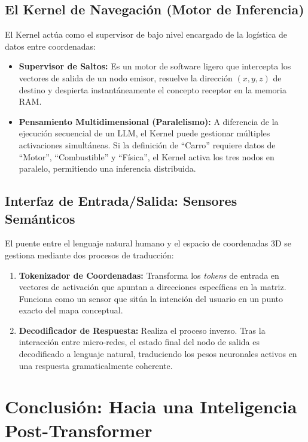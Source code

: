 \documentclass[12pt]{article}
\begin{document}
\subsection{El Kernel de Navegación (Motor de Inferencia)}
El Kernel actúa como el supervisor de bajo nivel encargado de la logística de datos entre coordenadas:
\begin{itemize}
    \item \textbf{Supervisor de Saltos:} Es un motor de software ligero que intercepta los vectores de salida de un nodo emisor, resuelve la dirección $(x,y,z)$ de destino y despierta instantáneamente el concepto receptor en la memoria RAM.
    \item \textbf{Pensamiento Multidimensional (Paralelismo):} A diferencia de la ejecución secuencial de un LLM, el Kernel puede gestionar múltiples activaciones simultáneas. Si la definición de ``Carro'' requiere datos de ``Motor'', ``Combustible'' y ``Física'', el Kernel activa los tres nodos en paralelo, permitiendo una inferencia distribuida.
\end{itemize}



\subsection{Interfaz de Entrada/Salida: Sensores Semánticos}
El puente entre el lenguaje natural humano y el espacio de coordenadas 3D se gestiona mediante dos procesos de traducción:
\begin{enumerate}
    \item \textbf{Tokenizador de Coordenadas:} Transforma los \textit{tokens} de entrada en vectores de activación que apuntan a direcciones específicas en la matriz. Funciona como un sensor que sitúa la intención del usuario en un punto exacto del mapa conceptual.
    \item \textbf{Decodificador de Respuesta:} Realiza el proceso inverso. Tras la interacción entre micro-redes, el estado final del nodo de salida es decodificado a lenguaje natural, traduciendo los pesos neuronales activos en una respuesta gramaticalmente coherente.
\end{enumerate}



\section{Conclusión: Hacia una Inteligencia Post-Transformer}
\end{document}
